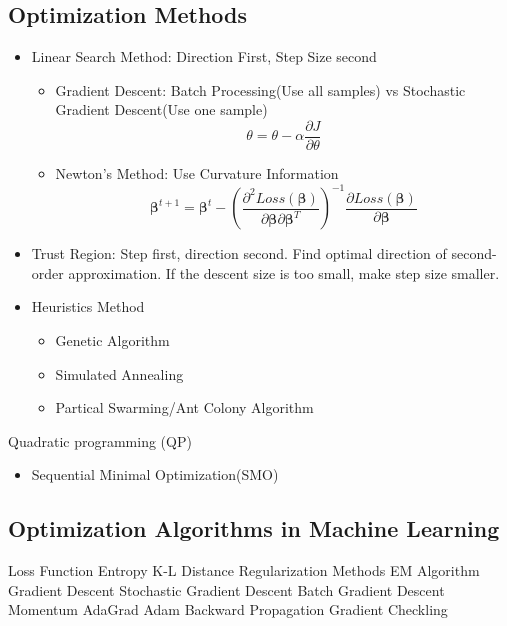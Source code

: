 \documentclass[11pt, openany]{book}              %
\begin{document}
\subsection{Optimization Methods}

\begin{itemize}
    \item Linear Search Method: Direction First, Step Size second	
    	\begin{itemize}  		
    		\item Gradient Descent: Batch Processing(Use all samples) vs Stochastic Gradient Descent(Use one sample)
    		$$ \theta = \theta - \alpha \frac{\partial J }{ \partial \theta }$$
    		\item Newton's Method: Use Curvature Information 
    		$$ \mathbold{\beta}^{t+1} = \mathbold{\beta}^t - (\frac{\partial^2 Loss(\mathbold{\beta})}{\partial \mathbold{\beta} \partial\mathbold{\beta}^T})^{-1} \frac{ \partial Loss(\mathbold{\beta})}{\partial \mathbold{\beta}} $$
   		\end{itemize}
   	\item Trust Region: Step first, direction second. Find optimal direction of second-order approximation. If the descent size is too small, make step size smaller.
   	\item Heuristics Method
   		\begin{itemize}  		
	    	\item Genetic Algorithm
	 	   	\item Simulated Annealing 
	    	\item Partical Swarming/Ant Colony Algorithm
	    \end{itemize}
\end{itemize}

Quadratic programming (QP)

\begin{itemize}
    \item Sequential Minimal Optimization(SMO) 
\end{itemize}

\subsection{Optimization Algorithms in Machine Learning}

		Loss Function
			Entropy
			K-L Distance
		Regularization Methods
		EM Algorithm
		Gradient Descent
			Stochastic Gradient Descent
			Batch Gradient Descent
			Momentum
			AdaGrad
			Adam
		Backward Propagation
		Gradient Checkling
		
\end{document}

